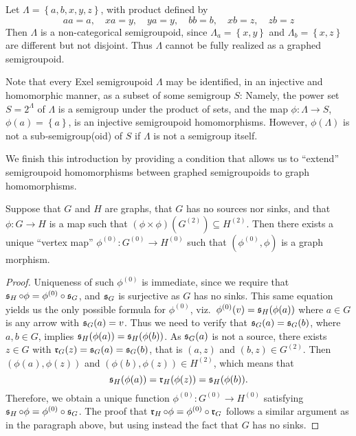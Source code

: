 \begin{example}
Let $\Lambda=\left\{a,b,x,y,z\right\}$, with product defined by
\[aa=a,\quad xa=y,\quad ya=y,\quad bb=b, \quad xb=z,\quad zb=z\]
Then $\Lambda$ is a non-categorical semigroupoid, since $\Lambda_a=\left\{x,y\right\}$ and $\Lambda_b=\left\{x,z\right\}$ are different but not disjoint. Thus $\Lambda$ cannot be fully realized as a graphed semigroupoid.
\end{example}

Note that every Exel semigroupoid $\Lambda$ may be identified, in an injective and homomorphic manner, as a subset of some semigroup $S$: Namely, the power set $S=2^\Lambda$ of $\Lambda$ is a semigroup under the product of sets, and the map $\phi\colon\Lambda\to S$, $\phi(a)=\left\{a\right\}$, is an injective semigroupoid homomorphisms. However, $\phi(\Lambda)$ is not a sub-semigroup(oid) of $S$ if $\Lambda$ is not a semigroup itself.

We finish this introduction by providing a condition that allows us to ``extend'' semigroupoid homomorphisms between graphed semigroupoids to graph homomorphisms.

\begin{proposition}\label{prop:vertexmap}
Suppose that $G$ and $H$ are graphs, that $G$ has no sources nor sinks, and that $\phi\colon G\to H$ is a map such that $(\phi\times\phi)(G^{(2)})\subseteq H^{(2)}$. Then there exists a unique ``vertex map'' $\phi^{(0)}\colon G^{(0)}\to H^{(0)}$ such that $(\phi^{(0)},\phi)$ is a graph morphism.
\end{proposition}
\begin{proof}
Uniqueness of such $\phi^{(0)}$ is immediate, since we require that $\operatorname{\mathfrak{s}}_H\circ\phi=\phi^{(0)}\circ\operatorname{\mathfrak{s}}_G$, and $\operatorname{\mathfrak{s}}_G$ is surjective as $G$ has no sinks. This same equation yields us the only possible formula for $\phi^{(0)}$, viz.\ $\phi^{(0)}(v)=\operatorname{\mathfrak{s}}_H(\phi(a))$ where $a\in G$ is any arrow with $\operatorname{\mathfrak{s}}_G(a)=v$. Thus we need to verify that $\operatorname{\mathfrak{s}}_G(a)=\operatorname{\mathfrak{s}}_G(b)$, where $a,b\in G$, implies $\operatorname{\mathfrak{s}}_H(\phi(a))=\operatorname{\mathfrak{s}}_H(\phi(b))$. As $\operatorname{\mathfrak{s}}_G(a)$ is not a source, there exists $z\in G$ with $\operatorname{\mathfrak{r}}_G(z)=\operatorname{\mathfrak{s}}_G(a)=\operatorname{\mathfrak{s}}_G(b)$, that is $(a,z)$ and $(b,z)\in G^{(2)}$. Then $(\phi(a),\phi(z))$ and $(\phi(b),\phi(z))\in H^{(2)}$, which means that
\[\operatorname{\mathfrak{s}}_H(\phi(a))=\operatorname{\mathfrak{r}}_H(\phi(z))=\operatorname{\mathfrak{s}}_H(\phi(b)).\]
Therefore, we obtain a unique function $\phi^{(0)}\colon G^{(0)}\to H^{(0)}$ satisfying $\operatorname{\mathfrak{s}}_H\circ\phi=\phi^{(0)}\circ\operatorname{\mathfrak{s}}_G$. The proof that $\operatorname{\mathfrak{r}}_H\circ\phi=\phi^{(0)}\circ\operatorname{\mathfrak{r}}_G$ follows a similar argument as in the paragraph above, but using instead the fact that $G$ has no sinks.\qedhere
\end{proof}

